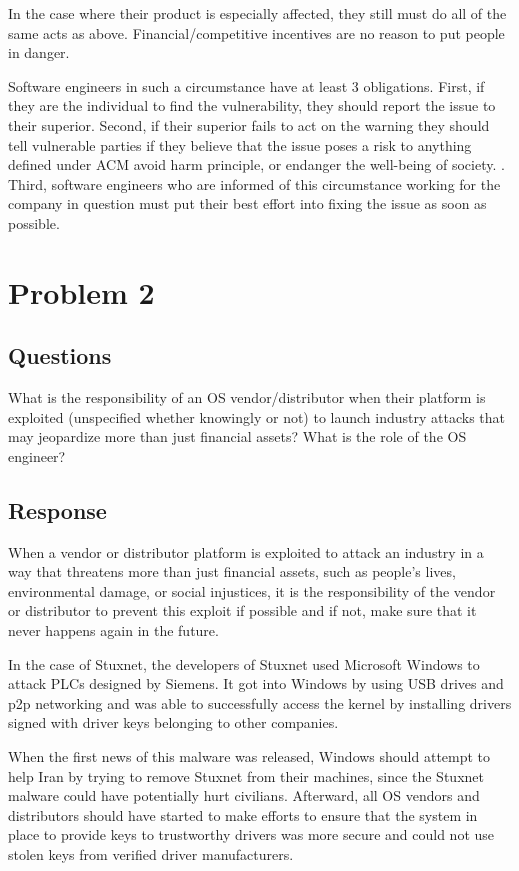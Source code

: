 \documentclass{assignment-x}
\begin{document}
In the case where their product is especially affected, they still must do all of the same acts as above. Financial/competitive incentives are no reason to put people in danger.

Software engineers in such a circumstance have at least 3 obligations. First, if they are the individual to find the vulnerability, they should report the issue to their superior. Second, if their superior fails to act on the warning they should tell vulnerable parties if they believe that the issue poses a risk to anything defined under ACM avoid harm principle, or endanger the well-being of society. \cite{ACMCodeOfEthics}. Third, software engineers who are informed of this circumstance working for the company in question must put their best effort into fixing the issue as soon as possible.

\section{Problem 2}
\subsection{Questions}
What is the responsibility of an OS vendor/distributor when their platform is exploited (unspecified whether knowingly or not) to launch industry attacks that may jeopardize more than just financial assets?
What is the role of the OS engineer?
\subsection{Response}
When a vendor or distributor platform is exploited to attack an industry in a way that threatens more than just financial assets, such as people's lives, environmental damage, or social injustices, it is the responsibility of the vendor or distributor to prevent this exploit if possible and if not, make sure that it never happens again in the future. 

In the case of Stuxnet, the developers of Stuxnet used Microsoft Windows to attack PLCs designed by Siemens. It got into Windows by using USB drives and p2p networking and was able to successfully access the kernel by installing drivers signed with driver keys belonging to other companies. \cite{stuxnet_wikipedia}

When the first news of this malware was released, Windows should attempt to help Iran by trying to remove Stuxnet from their machines, since the Stuxnet malware could have potentially hurt civilians. Afterward, all OS vendors and distributors should have started to make efforts to ensure that the system in place to provide keys to trustworthy drivers was more secure and could not use stolen keys from verified driver manufacturers.
\end{document}
